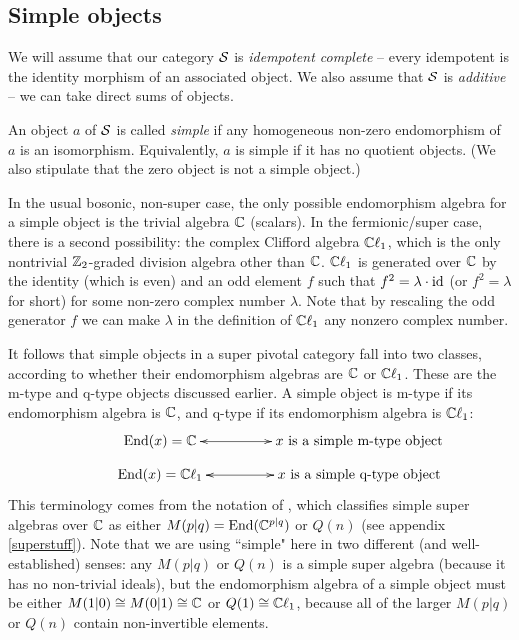 



\subsection{Simple objects}  \label{def_sob_ss}

We will assume that our category $\mathcal{S}$ is {\it idempotent complete} -- 
every idempotent is the identity morphism of an associated object.
We also assume that $\mathcal{S}$ is {\it additive} -- we can take direct sums of objects.

An object $a$ of $\mathcal{S}$ is called {\it simple} if any homogeneous non-zero endomorphism of $a$ is an isomorphism.
Equivalently, $a$ is simple if it has no quotient objects.
(We also stipulate that the zero object is not a simple object.)

In the usual bosonic, non-super case, the only possible endomorphism algebra for a simple object
is the trivial algebra $\mathbb{C}$ (scalars).
In the fermionic/super case, there is a second possibility: the complex Clifford algebra $\mathbb{C}\ell_1$, 
which is the only nontrivial $\mathbb{Z}_2$-graded division algebra other than $\mathbb{C}$.
$\mathbb{C}\ell_1$ is generated over $\mathbb{C}$ by the identity (which is even) and an odd element $f$ such that $f^2 = \lambda \cdot \text{id}$
(or $f^2 = \lambda$ for short) for some non-zero complex number $\lambda$. 
Note that by rescaling the odd generator $f$ we can make $\lambda$ in the definition of $\mathbb{C}\ell_1$ any nonzero complex number. 

It follows that simple objects in a super pivotal category fall into two classes, according to whether their endomorphism algebras are $\mathbb{C}$ or $\mathbb{C}\ell_1$. 
These are the m-type and q-type objects discussed earlier. 
A simple object is {m-type} if its endomorphism algebra
is $\mathbb{C}$, and {q-type} if its endomorphism algebra is $\mathbb{C}\ell_1$:
\begin{align}
\vcenter{\xymatrix @!0 @M=1mm @C=25mm{
& \text{End}(x) = \mathbb{C} \ar@{<->}[rr] &   &\text{$x$ is a simple m-type object}&  \\
&\text{End}(x) = \mathbb{C} \ell_1 \ar@{<->}[rr]  &  &\text{$x$ is a simple q-type object}&
	}}
\end{align}
This terminology comes from the notation of \cite{jozefiak1988}, which classifies simple super algebras over $\mathbb{C}$ as either
$M(p|q) = \text{End}(\mathbb{C}^{p|q})$ or $Q(n)$ (see appendix \ref{superstuff}).
Note that we are using ``simple" here in two different (and well-established) senses: 
any $M(p|q)$ or $Q(n)$ is a simple super algebra
(because it has no non-trivial ideals), but the endomorphism algebra of a simple object must be either
$M(1|0) \cong M(0|1) \cong \mathbb{C}$ or $Q(1) \cong \mathbb{C}\ell_1$,
because all of the larger $M(p|q)$ or $Q(n)$ contain non-invertible elements.

